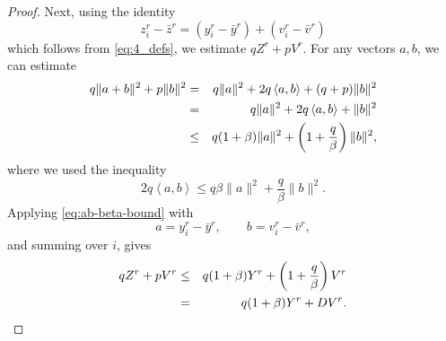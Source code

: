 \documentclass{article}
\newcommand{\anglebr}[1]{\left\langle#1\right\rangle} %
\newcommand{\inner}[2]{\anglebr{#1, #2}}
\theoremstyle{plain}
\theoremstyle{definition}
\begin{document}
\begin{proof}
Next, using the identity
\[
z_i^r-\bar z^r=(y_i^r-\bar y^r)+(v_i^r-\bar v^r)
\]
which follows from \eqref{eq:4_defs}, 
we estimate \(qZ^r+pV^r\). For any vectors \(a,b\), we can estimate \begin{eqnarray}
q\|a+b\|^2+p\|b\|^2
&=&
q\|a\|^2+2q\inner{a}{b}+(q+p)\|b\|^2
\notag\\
&=&
q\|a\|^2+2q\inner{a}{b}+\|b\|^2
\notag\\
&\leq&
q(1+\beta)\|a\|^2+\left(1+\frac{q}{\beta}\right)\|b\|^2,
\label{eq:ab-beta-bound}
\end{eqnarray}
where we used the inequality
\[
2q\inner{a}{b}
\le
q\beta\|a\|^2+\frac{q}{\beta}\|b\|^2.
\]
Applying \eqref{eq:ab-beta-bound} with
\[
a=y_i^r-\bar y^r,
\qquad
b=v_i^r-\bar v^r,
\]
and summing over \(i\), gives
\begin{eqnarray}
qZ^r+pV^r
&\leq&
q(1+\beta)Y^r+\left(1+\frac{q}{\beta}\right)V^r
\notag\\
&=&
q(1+\beta)Y^r+DV^r.
\label{eq:gamma-v-bound}
\end{eqnarray}


\end{proof}
\end{document}
